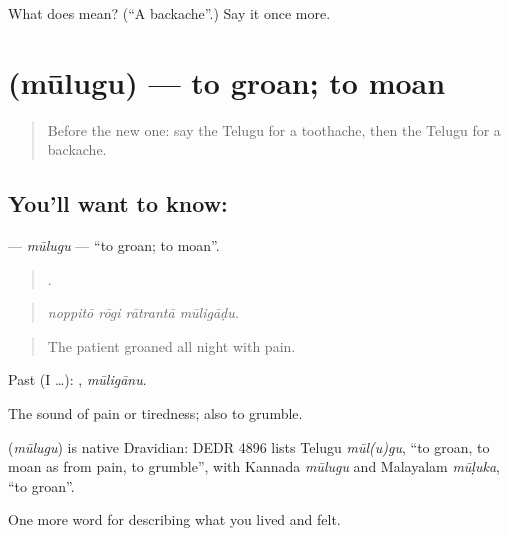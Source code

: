 \begin{tcolorbox}[breakable,colback=teal!4,colframe=teal!35!black,title={Before you move on}]
What does  mean? (\textquotedblleft{}A backache\textquotedblright{}.) Say it once more.
\end{tcolorbox}
\section[\texorpdfstring{\te{మూలుగు} (mūlugu)}{మూలుగు (mūlugu)}]{ (mūlugu) — to groan; to moan}

\label{lesson:TE-C514-mulugu}



\begin{quote}
Before the new one: say the Telugu for a toothache, then the Telugu for a backache.
\end{quote}

\subsection*{You'll want to know: }
\textbf{} — \emph{mūlugu} — \textquotedblleft{}to groan; to moan\textquotedblright{}.

\begin{quote}
   .
\end{quote}

\begin{quote}
\emph{noppitō rōgi rātrantā mūligāḍu.}
\end{quote}

\begin{quote}
The patient groaned all night with pain.
\end{quote}

Past (I …): , \emph{mūligānu}.

The sound of pain or tiredness; also to grumble.

\begin{cousinweb}
\textbf{} (\emph{mūlugu}) is native Dravidian: DEDR 4896 lists Telugu \emph{mūl(u)gu}, \textquotedblleft{}to groan, to moan as from pain, to grumble\textquotedblright{}, with Kannada \emph{mūlugu} and Malayalam \emph{mūḷuka}, \textquotedblleft{}to groan\textquotedblright{}.
\end{cousinweb}

\begin{grammarlens}[title={What you've built}]
One more word for describing what you lived and felt.
\end{grammarlens}

